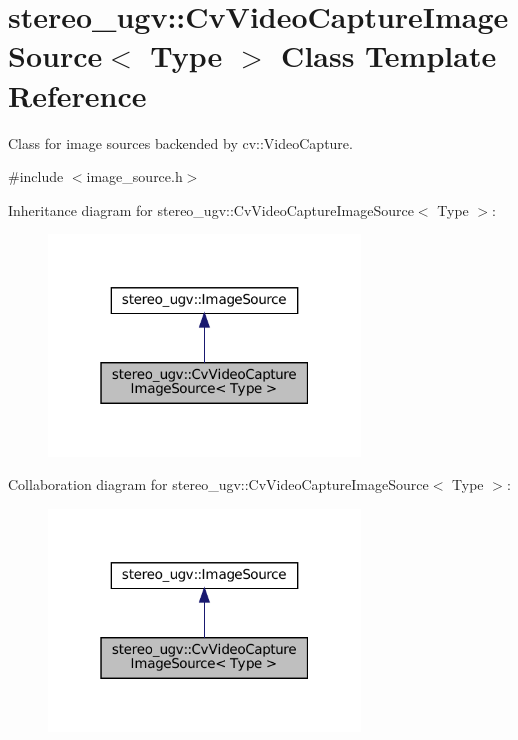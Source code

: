 \hypertarget{classstereo__ugv_1_1CvVideoCaptureImageSource}{}\section{stereo\+\_\+ugv\+:\+:Cv\+Video\+Capture\+Image\+Source$<$ Type $>$ Class Template Reference}
\label{classstereo__ugv_1_1CvVideoCaptureImageSource}


Class for image sources backended by cv\+::\+Video\+Capture.  




{\ttfamily \#include $<$image\+\_\+source.\+h$>$}



Inheritance diagram for stereo\+\_\+ugv\+:\+:Cv\+Video\+Capture\+Image\+Source$<$ Type $>$\+:
\nopagebreak
\begin{figure}[H]
\begin{center}
\leavevmode
\includegraphics[width=235pt]{classstereo__ugv_1_1CvVideoCaptureImageSource__inherit__graph}
\end{center}
\end{figure}


Collaboration diagram for stereo\+\_\+ugv\+:\+:Cv\+Video\+Capture\+Image\+Source$<$ Type $>$\+:
\nopagebreak
\begin{figure}[H]
\begin{center}
\leavevmode
\includegraphics[width=235pt]{classstereo__ugv_1_1CvVideoCaptureImageSource__coll__graph}
\end{center}
\end{figure}
